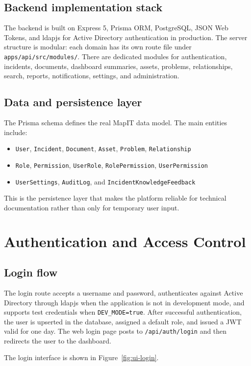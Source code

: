 \subsection{Backend implementation stack}
The backend is built on Express 5, Prisma ORM, PostgreSQL, JSON Web Tokens, and ldapjs for Active Directory authentication in production. The server structure is modular: each domain has its own route file under \texttt{apps/api/src/modules/}. There are dedicated modules for authentication, incidents, documents, dashboard summaries, assets, problems, relationships, search, reports, notifications, settings, and administration.

\subsection{Data and persistence layer}
The Prisma schema defines the real MapIT data model. The main entities include:
\begin{itemize}
	\item \texttt{User}, \texttt{Incident}, \texttt{Document}, \texttt{Asset}, \texttt{Problem}, \texttt{Relationship}
	\item \texttt{Role}, \texttt{Permission}, \texttt{UserRole}, \texttt{RolePermission}, \texttt{UserPermission}
	\item \texttt{UserSettings}, \texttt{AuditLog}, and \texttt{IncidentKnowledgeFeedback}
\end{itemize}
This is the persistence layer that makes the platform reliable for technical documentation rather than only for temporary user input.

\section{Authentication and Access Control}
\subsection{Login flow}
The login route accepts a username and password, authenticates against Active Directory through ldapjs when the application is not in development mode, and supports test credentials when \texttt{DEV\_MODE=true}. After successful authentication, the user is upserted in the database, assigned a default role, and issued a JWT valid for one day. The web login page posts to \texttt{/api/auth/login} and then redirects the user to the dashboard.

The login interface is shown in Figure~\ref{fig:ui-login}.

